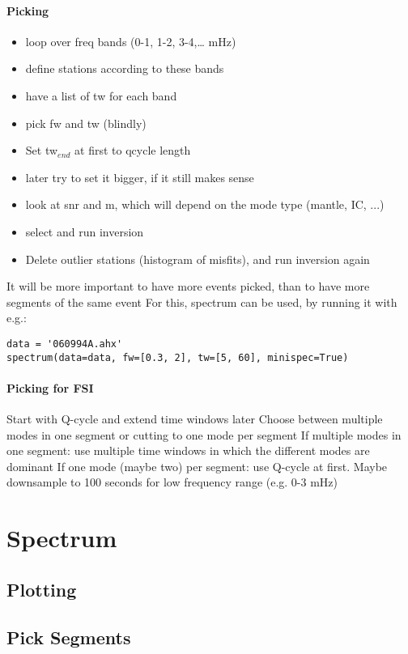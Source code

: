 \documentclass{article}
\begin{document}
\paragraph{Picking}
\begin{itemize}
\item loop over freq bands (0-1, 1-2, 3-4,… mHz)
\item define stations according to these bands
\item have a list of tw for each band
\item pick fw and tw (blindly)
\item Set tw$_{end}$ at first to qcycle length
\item later try to set it bigger, if it still makes sense
\item look at snr and m, which will depend on the mode type (mantle, IC, ...)
\item select and run inversion
\item Delete outlier stations (histogram of misfits), and run inversion again
\end{itemize}
It will be more important to have more events picked, than to have more segments of the same event
For this, spectrum can be used, by running it with e.g.:
\begin{lstlisting}
data = '060994A.ahx'
spectrum(data=data, fw=[0.3, 2], tw=[5, 60], minispec=True)
\end{lstlisting}

\paragraph{Picking for FSI}

Start with Q-cycle and extend time windows later
Choose between multiple modes in one segment or cutting to one mode per segment
If multiple modes in one segment: use multiple time windows in which the different modes are dominant
If one mode (maybe two) per segment: use Q-cycle at first.
Maybe downsample to 100 seconds for low frequency range (e.g. 0-3 mHz)

\section{Spectrum}
\subsection{Plotting}
\subsection{Pick Segments}
\end{document}

